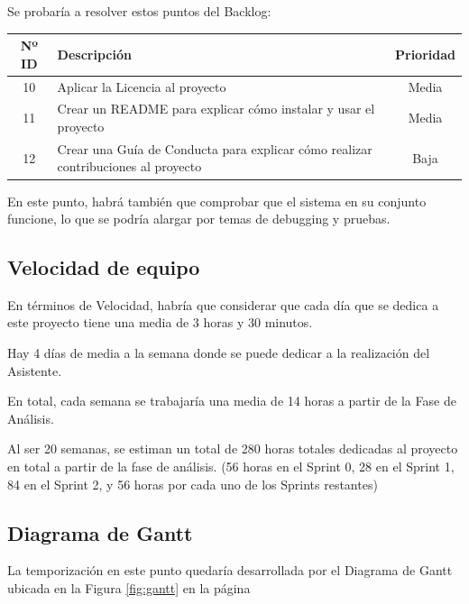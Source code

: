 Se probaría a resolver estos puntos del Backlog:
\begin{table}[H]
	\begin{tabularx}{\textwidth}{|c|X|c|}
		\hline
		{\cellcolor{mintgreen}} \textbf{Nº ID} & {\cellcolor{mintgreen}} \textbf{Descripción} & {\cellcolor{mintgreen}} \textbf{Prioridad} \\
		\hline
		10 &  Aplicar la Licencia al proyecto & Media \\
		\hline
		11 & Crear un README para explicar cómo instalar y usar el proyecto & Media \\
		\hline
		12 & Crear una Guía de Conducta para explicar cómo realizar contribuciones al proyecto & Baja \\
		\hline
	\end{tabularx}
\end{table}

En este punto, habrá también que comprobar que el sistema en su conjunto funcione, lo que se podría alargar por temas de debugging y pruebas.

\subsection{Velocidad de equipo}
En términos de Velocidad, habría que considerar que cada día que se dedica a este proyecto tiene una media de 3 horas y 30 minutos.

Hay 4 días de media a la semana donde se puede dedicar a la realización del Asistente. 

En total, cada semana se trabajaría una media de 14 horas a partir de la Fase de Análisis.

Al ser 20 semanas, se estiman un total de 280 horas totales dedicadas al proyecto en total a partir de la fase de análisis. (56 horas en el Sprint 0, 28 en el Sprint 1, 84 en el Sprint 2, y 56 horas por cada uno de los Sprints restantes)

\subsection{Diagrama de Gantt}
La temporización en este punto quedaría desarrollada por el Diagrama de Gantt ubicada en la Figura \ref{fig:gantt} en la página \pageref{fig:gantt}


